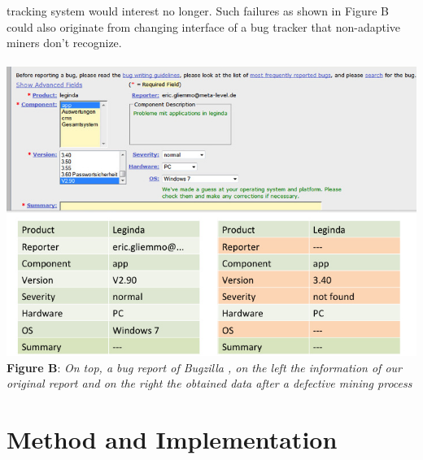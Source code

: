 tracking system would interest no longer. Such failures as shown in Figure B could also originate from changing interface of a bug tracker that non-adaptive miners don't recognize. \\ \\ \includegraphics[width=1.0\textwidth]{Folie1.jpg}   \\\textbf{Figure B}: \textit{On top, a bug report of Bugzilla , on the left the information of our original report and on the right the obtained data after a defective mining process}

\chapter{Method and Implementation}
\label{Method an Implementation}

